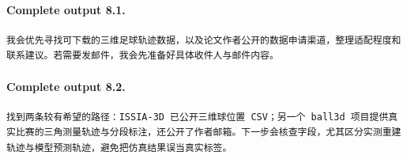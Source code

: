 \documentclass[UTF8,10pt]{ctexart}
\begin{document}
\paragraph{Complete output 8.1.}
\begin{Verbatim}[breaklines=true,breakanywhere=true,fontsize=\scriptsize,frame=single,framesep=2pt]
我会优先寻找可下载的三维足球轨迹数据，以及论文作者公开的数据申请渠道，整理适配程度和联系建议。若需要发邮件，我会先准备好具体收件人与邮件内容。
\end{Verbatim}

\paragraph{Complete output 8.2.}
\begin{Verbatim}[breaklines=true,breakanywhere=true,fontsize=\scriptsize,frame=single,framesep=2pt]
找到两条较有希望的路径：ISSIA-3D 已公开三维球位置 CSV；另一个 ball3d 项目提供真实比赛的三角测量轨迹与分段标注，还公开了作者邮箱。下一步会核查字段，尤其区分实测重建轨迹与模型预测轨迹，避免把仿真结果误当真实标签。
\end{Verbatim}
\end{document}
